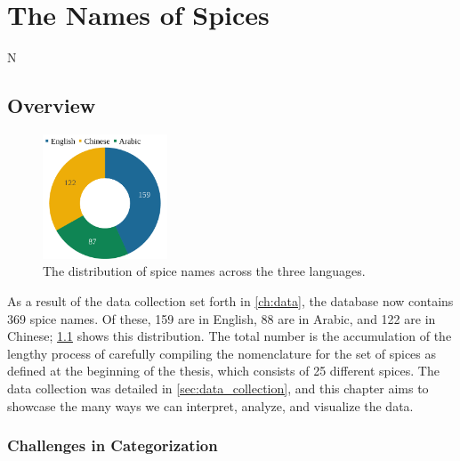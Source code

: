 \chapter{The Names of Spices}
\label{ch:names}


N

\section{Overview}

\begin{figure}
  \includegraphics[width=0.33\textwidth]{imgs/plots/languages_pie.pdf}
\caption[The distribution of spice names across the three languages.]{The distribution of spice names across the three languages.}
\label{fig:languages_pie}
\end{figure}

As a result of the data collection set forth in \cref{ch:data}, the database now contains 369 spice names. Of these, 159 are in English, 88 are in Arabic, and 122 are in Chinese; \cref{fig:languages_pie} shows this distribution.
The total number is the accumulation of the lengthy process of carefully compiling the nomenclature for the set of spices as defined at the beginning of the thesis, which consists of 25 different spices. The data collection was detailed in \cref{sec:data_collection}, and this chapter aims to showcase the many ways we can interpret, analyze, and visualize the data.

\subsection{Challenges in Categorization}

